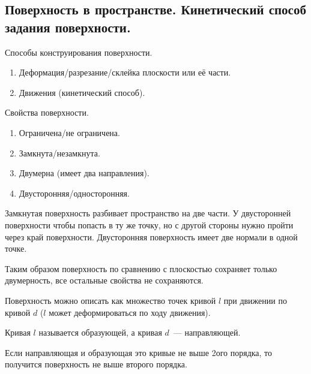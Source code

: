 \subsection{%
  Поверхность в пространстве. Кинетический способ задания поверхности.%
}

Способы конструирования поверхности.

\begin{enumerate}
\item
  Деформация/разрезание/склейка плоскости или её части.

\item
  Движения (кинетический способ).
\end{enumerate}

Свойства поверхности.

\begin{enumerate}
\item
  Ограничена/не ограничена.

\item
  Замкнута/незамкнута.

\item
  Двумерна (имеет два направления).

\item
  Двусторонняя/односторонняя.  
\end{enumerate}

\begin{remark}
  Замкнутая поверхность разбивает пространство на две части. У двусторонней
  поверхности чтобы попасть в ту же точку, но с другой стороны нужно пройти
  через край поверхности. Двусторонняя поверхность имеет две нормали в одной
  точке.

  Таким образом поверхность по сравнению с плоскостью сохраняет только
  двумерность, все остальные свойства не сохраняются.
\end{remark}


Поверхность можно описать как множество точек кривой \(l\) при движении по
кривой \(d\) (\(l\) может деформироваться по ходу движения).

\begin{definition}
  Кривая \(l\) называется образующей, а кривая \(d\)~--- направляющей.
\end{definition}

\begin{remark}
  Если направляющая и образующая это кривые не выше 2ого порядка, то получится
поверхность не выше второго порядка.
\end{remark}
